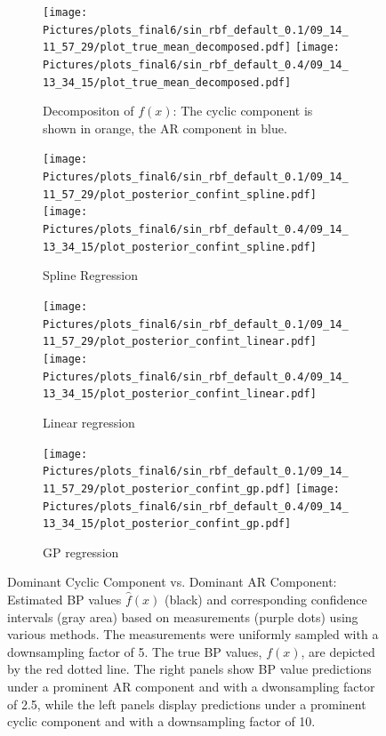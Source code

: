 \begin{figure}
\begin{subfigure}{\textwidth}
    \centering
    \texttt{[image: 
    Pictures/plots\_final6/sin\_rbf\_default\_0.1/09\_14\_11\_57\_29/plot\_true\_mean\_decomposed.pdf]}
    \texttt{[image: 
    Pictures/plots\_final6/sin\_rbf\_default\_0.4/09\_14\_13\_34\_15/plot\_true\_mean\_decomposed.pdf]}
  \caption{Decompositon of $f(x)$: The cyclic component is shown in orange, the AR component in blue.}
\end{subfigure}

\begin{subfigure}{\textwidth}
    \centering
    \texttt{[image: 
    Pictures/plots\_final6/sin\_rbf\_default\_0.1/09\_14\_11\_57\_29/plot\_posterior\_confint\_spline.pdf]}
    \texttt{[image: 
        Pictures/plots\_final6/sin\_rbf\_default\_0.4/09\_14\_13\_34\_15/plot\_posterior\_confint\_spline.pdf]}
  \caption{Spline Regression }
\end{subfigure}

\begin{subfigure}{\textwidth}
    \centering
    \texttt{[image: 
    Pictures/plots\_final6/sin\_rbf\_default\_0.1/09\_14\_11\_57\_29/plot\_posterior\_confint\_linear.pdf]}
    \texttt{[image: 
        Pictures/plots\_final6/sin\_rbf\_default\_0.4/09\_14\_13\_34\_15/plot\_posterior\_confint\_linear.pdf]}
  \caption{Linear regression }
\end{subfigure}

\begin{subfigure}{\textwidth}
    \centering
    \texttt{[image: 
    Pictures/plots\_final6/sin\_rbf\_default\_0.1/09\_14\_11\_57\_29/plot\_posterior\_confint\_gp.pdf]}
    \texttt{[image: 
        Pictures/plots\_final6/sin\_rbf\_default\_0.4/09\_14\_13\_34\_15/plot\_posterior\_confint\_gp.pdf]}
  \caption{GP regression}
\end{subfigure}\hfill
\caption[Dominant Cyclic Component vs. Dominant AR Component]{
Dominant Cyclic Component vs. Dominant AR Component:
    Estimated BP values $\hat{f}(x)$ (black) and corresponding confidence intervals (gray area)
    based on measurements (purple dots) using various methods.
    The measurements were uniformly sampled with a downsampling factor of 5.
    The true BP values, $f(x)$, are depicted by the red dotted line.
    The right panels show BP value predictions under a prominent AR component and with a dwonsampling factor of 2.5,
    while the left panels display predictions under a prominent cyclic component and with a downsampling factor of 10.
 }
\label{fig:ex-ar-cyclic}
\end{figure}



